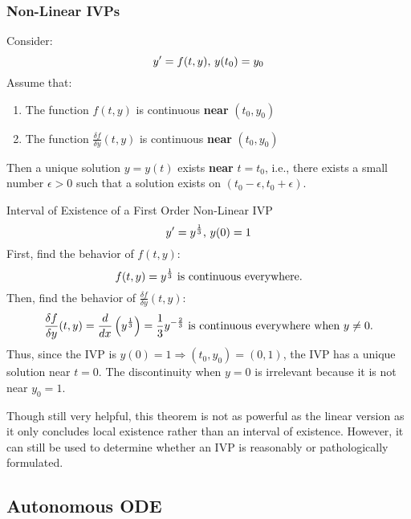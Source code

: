 \documentclass[12pt]{article}
\begin{document}
\subsubsection{Non-Linear IVPs}
\label{sssec:nonLinearIVPs}

Consider:
\begin{equation*}
  y' = f(t,y)\textup{,}\ y(t_0) = y_0
\end{equation*}
Assume that:
\begin{enumerate}
  \itemsep0em
  \item The function $f(t,y)$ is continuous \textbf{near} $(t_0,y_0)$
  \item The function $\frac{\delta f}{\delta y}(t,y)$ is continuous \textbf{near} $(t_0,y_0)$
\end{enumerate}
Then a unique solution $y=y(t)$ exists \textbf{near} $t=t_0$, i.e., there exists a small number $\epsilon > 0$ such that a solution exists on $(t_0-\epsilon,t_0+\epsilon)$.

\begin{example}{Interval of Existence of a First Order Non-Linear IVP}
  \begin{equation*}
    y' = y^{\frac{1}{3}}\textup{,}\ y(0) = 1
  \end{equation*}
  First, find the behavior of $f(t,y)$:
  \begin{equation*}
    f(t,y) = y^{\frac{1}{3}}\ \textup{is continuous everywhere.}
  \end{equation*}
  Then, find the behavior of $\frac{\delta f}{\delta y}(t,y)$:
  \begin{equation*}
    \frac{\delta f}{\delta y}(t,y) = \frac{d}{dx}\left(y^{\frac{1}{3}}\right) = \frac{1}{3}y^{-\frac{2}{3}}\ \textup{is continuous everywhere when $y\neq0$.}
  \end{equation*}
  Thus, since the IVP is $y(0)=1 \Rightarrow (t_0,y_0) = (0,1)$, the IVP has a unique solution near $t=0$. The discontinuity when $y=0$ is irrelevant because it is not near $y_0=1$.
\end{example}

Though still very helpful, this theorem is not as powerful as the linear version as it only concludes local existence rather than an interval of existence. However, it can still be used to determine whether an IVP is reasonably or pathologically formulated.

\subsection{Autonomous ODE}
\label{ssec:autonomousODE}
\end{document}
